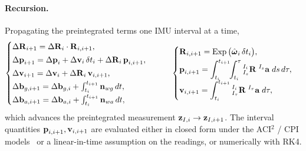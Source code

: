 \paragraph{Recursion.} Propagating the preintegrated terms one IMU interval at a time,
\begin{align}
\begin{cases}
\Delta\boldsymbol{\mathbf{R}}_{i+1} = \Delta\boldsymbol{\mathbf{R}}_i \cdot \boldsymbol{\mathbf{R}}_{i,i+1}, \\[2pt]
\Delta\boldsymbol{\mathbf{p}}_{i+1} = \Delta\boldsymbol{\mathbf{p}}_i + \Delta\boldsymbol{\mathbf{v}}_i\,\delta t_i + \Delta\boldsymbol{\mathbf{R}}_i\,\boldsymbol{\mathbf{p}}_{i,i+1}, \\[2pt]
\Delta\boldsymbol{\mathbf{v}}_{i+1} = \Delta\boldsymbol{\mathbf{v}}_i + \Delta\boldsymbol{\mathbf{R}}_i\,\boldsymbol{\mathbf{v}}_{i,i+1}, \\[2pt]
\Delta\boldsymbol{\mathbf{b}}_{g,i+1} = \Delta\boldsymbol{\mathbf{b}}_{g,i} + \int_{t_i}^{t_{i+1}} \boldsymbol{\mathbf{n}}_{wg}\,dt, \\[2pt]
\Delta\boldsymbol{\mathbf{b}}_{a,i+1} = \Delta\boldsymbol{\mathbf{b}}_{a,i} + \int_{t_i}^{t_{i+1}} \boldsymbol{\mathbf{n}}_{wa}\,dt,
\end{cases}
\qquad
\begin{cases}
\boldsymbol{\mathbf{R}}_{i,i+1} = \operatorname{Exp}\big(\hat{\boldsymbol{\mathbf{\omega}}}_i\,\delta t_i\big), \\[2pt]
\boldsymbol{\mathbf{p}}_{i,i+1} = \displaystyle\int_{t_i}^{t_{i+1}}\!\!\int_{t_i}^{\tau} {}^{I_i}_{I_s}\boldsymbol{\mathbf{R}}\;{}^{I_s}\boldsymbol{\mathbf{a}}\;ds\,d\tau, \\[2pt]
\boldsymbol{\mathbf{v}}_{i,i+1} = \displaystyle\int_{t_i}^{t_{i+1}} {}^{I_i}_{I_\tau}\boldsymbol{\mathbf{R}}\;{}^{I_\tau}\boldsymbol{\mathbf{a}}\;d\tau,
\end{cases}
\label{eq:lec07-recursion}
\end{align}
which advances the preintegrated measurement $\boldsymbol{\mathbf{z}}_{I,i} \to \boldsymbol{\mathbf{z}}_{I,i+1}$. The interval quantities $\boldsymbol{\mathbf{p}}_{i,i+1}, \boldsymbol{\mathbf{v}}_{i,i+1}$ are evaluated either in closed form under the ACI$^2$ / CPI models~\cite{Yang2020ACI2,Eckenhoff2019IJRR} or a linear-in-time assumption on the readings, or numerically with RK4.

